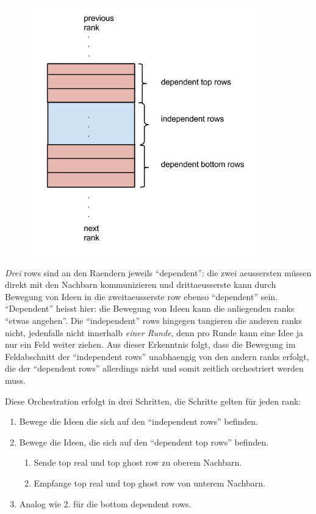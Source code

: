 \begin{figure}[htbp]
\centering
\includegraphics{pics/dependent-rows.jpg}
\end{figure}

\emph{Drei} rows sind an den Raendern jeweils ``dependent'': die zwei
aeussersten müssen direkt mit den Nachbarn kommunizieren und
drittaeusserste kann durch Bewegung von Ideen in die zweitaeusserste row
ebenso ``dependent'' sein. ``Dependent'' heisst hier: die Bewegung von
Ideen kann die anliegenden ranks ``etwas angehen''. Die ``independent''
rows hingegen tangieren die anderen ranks nicht, jedenfalls nicht
innerhalb \emph{einer Runde}, denn pro Runde kann eine Idee ja nur ein
Feld weiter ziehen. Aus dieser Erkenntnis folgt, dass die Bewegung im
Feldabschnitt der ``independent rows'' unabhaengig von den andern ranks
erfolgt, die der ``dependent rows'' allerdings nicht und somit zeitlich
orchestriert werden muss.

Diese Orchestration erfolgt in drei Schritten, die Schritte gelten für
jeden rank:

\begin{enumerate}
\def\labelenumi{\arabic{enumi}.}
\itemsep1pt\parskip0pt
\item
  Bewege die Ideen die sich auf den ``independent rows'' befinden.
\item
  Bewege die Ideen, die sich auf den ``dependent top rows'' befinden.

  \begin{enumerate}
  \def\labelenumii{\arabic{enumii}.}
  \itemsep1pt\parskip0pt
  \item
    Sende top real und top ghost row zu oberem Nachbarn.
  \item
    Empfange top real und top ghost row von unterem Nachbarn.
  \end{enumerate}
\item
  Analog wie 2. für die bottom dependent rows.
\end{enumerate}

